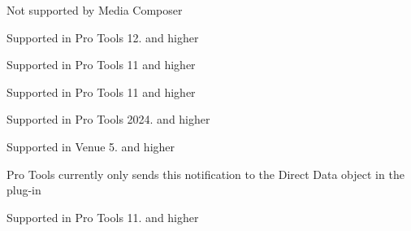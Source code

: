 \begin{DoxyRefList}
Not supported by Media Composer 
\item[Member \mbox{\hyperlink{a00524_afab5ea2cfd731fc8f163b6caa685406ea3336fd8cb2428399ab640ee91582c626}{AAX\+\_\+e\+Notification\+Event\+\_\+\+Delay\+Compensation\+State}} ]\label{a00879__compatibility_notes000034}%
%
 Supported in Pro Tools 12. and higher 
\item[Member \mbox{\hyperlink{a00524_afab5ea2cfd731fc8f163b6caa685406eacb91c4b0d87f576d27da721ebce4bf37}{AAX\+\_\+e\+Notification\+Event\+\_\+\+Entering\+Offline\+Mode}} ]\label{a00879__compatibility_notes000030}%
%
 Supported in Pro Tools 11 and higher 
\item[Member \mbox{\hyperlink{a00524_afab5ea2cfd731fc8f163b6caa685406ea69594361a5f845b0275bcd7e953d1b25}{AAX\+\_\+e\+Notification\+Event\+\_\+\+Exiting\+Offline\+Mode}} ]\label{a00879__compatibility_notes000031}%
%
 Supported in Pro Tools 11 and higher 
\item[Member \mbox{\hyperlink{a00524_afab5ea2cfd731fc8f163b6caa685406eacdf4401c59705b61bc87408f72ed953a}{AAX\+\_\+e\+Notification\+Event\+\_\+\+Host\+Locale}} ]\label{a00879__compatibility_notes000043}%
%
 Supported in Pro Tools 2024. and higher 
\item[Member \mbox{\hyperlink{a00524_afab5ea2cfd731fc8f163b6caa685406ea59ab8642f090b5ae21385982a1ffaa7b}{AAX\+\_\+e\+Notification\+Event\+\_\+\+Host\+Mode\+Changed}} ]\label{a00879__compatibility_notes000039}%
%
 Supported in Venue 5. and higher 
\item[Member \mbox{\hyperlink{a00524_afab5ea2cfd731fc8f163b6caa685406ea03306ffe8c87fe3706c1c73df1a158e7}{AAX\+\_\+e\+Notification\+Event\+\_\+\+Log\+State}} ]\label{a00879__compatibility_notes000041}%
%
 Pro Tools currently only sends this notification to the Direct Data object in the plug-\/in 
\item[Member \mbox{\hyperlink{a00524_afab5ea2cfd731fc8f163b6caa685406ea74ab285136093261fd246572659f119c}{AAX\+\_\+e\+Notification\+Event\+\_\+\+Max\+View\+Size\+Changed}} ]\label{a00879__compatibility_notes000035}%
%
 Supported in Pro Tools 11. and higher 
\item[Member \mbox{\hyperlink{a00524_afab5ea2cfd731fc8f163b6caa685406ea1bd57ffeaf4cbb800f9a7ea1cd6d9908}{AAX\+\_\+e\+Notification\+Event\+\_\+\+Parameter\+Name\+Changed}} ]\label{a00879__compatibility_notes000038}%

\end{DoxyRefList}
